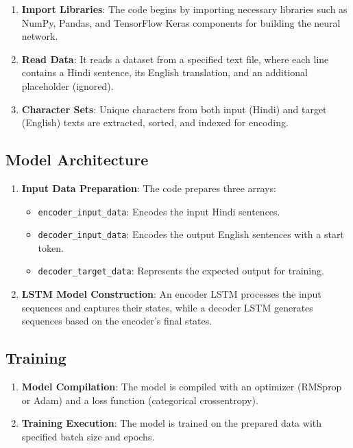 \documentclass{article}
\begin{document}
\begin{enumerate}
    \item \textbf{Import Libraries}: 
    The code begins by importing necessary libraries such as NumPy, Pandas, and TensorFlow Keras components for building the neural network.

    \item \textbf{Read Data}: 
    It reads a dataset from a specified text file, where each line contains a Hindi sentence, its English translation, and an additional placeholder (ignored).

    \item \textbf{Character Sets}: 
    Unique characters from both input (Hindi) and target (English) texts are extracted, sorted, and indexed for encoding.
\end{enumerate}

\subsection*{Model Architecture}

\begin{enumerate}
    \item \textbf{Input Data Preparation}: 
    The code prepares three arrays:
    \begin{itemize}
        \item \texttt{encoder\_input\_data}: Encodes the input Hindi sentences.
        \item \texttt{decoder\_input\_data}: Encodes the output English sentences with a start token.
        \item \texttt{decoder\_target\_data}: Represents the expected output for training.
    \end{itemize}
    
    \item \textbf{LSTM Model Construction}: 
    An encoder LSTM processes the input sequences and captures their states, while a decoder LSTM generates sequences based on the encoder's final states.
\end{enumerate}

\subsection*{Training}

\begin{enumerate}
    \item \textbf{Model Compilation}: 
    The model is compiled with an optimizer (RMSprop or Adam) and a loss function (categorical crossentropy).
    
    \item \textbf{Training Execution}: 
    The model is trained on the prepared data with specified batch size and epochs.
\end{enumerate}
\end{document}
